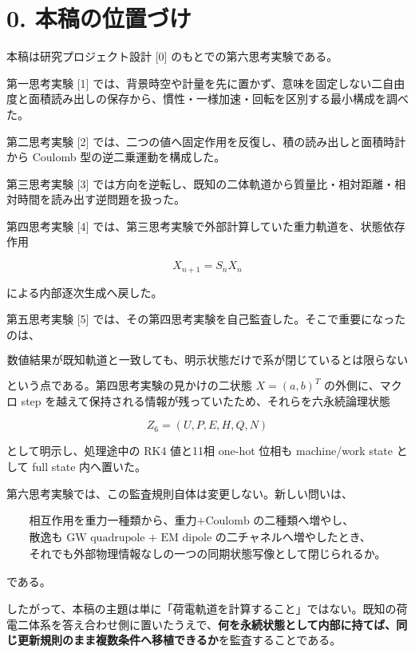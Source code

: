 \documentclass[
  a4paper,
]{ltjsarticle}
\begin{document}
\section{0.
本稿の位置づけ}\label{ux672cux7a3fux306eux4f4dux7f6eux3065ux3051}

本稿は研究プロジェクト設計 {[}0{]} のもとでの第六思考実験である。

第一思考実験 {[}1{]}
では、背景時空や計量を先に置かず、意味を固定しない二自由度と面積読み出しの保存から、慣性・一様加速・回転を区別する最小構成を調べた。

第二思考実験 {[}2{]}
では、二つの値へ固定作用を反復し、積の読み出しと面積時計から Coulomb
型の逆二乗運動を構成した。

第三思考実験 {[}3{]}
では方向を逆転し、既知の二体軌道から質量比・相対距離・相対時間を読み出す逆問題を扱った。

第四思考実験 {[}4{]}
では、第三思考実験で外部計算していた重力軌道を、状態依存作用

\[
X_{n+1}=S_nX_n
\]

による内部逐次生成へ戻した。

第五思考実験 {[}5{]}
では、その第四思考実験を自己監査した。そこで重要になったのは、

\[
\boxed{
\text{数値結果が既知軌道と一致しても、明示状態だけで系が閉じているとは限らない}
}
\]

という点である。第四思考実験の見かけの二状態 \(X=(a,b)^T\)
の外側に、マクロ step
を越えて保持される情報が残っていたため、それらを六永続論理状態

\[
Z_6=(U,P,E,H,Q,N)
\]

として明示し、処理途中の RK4 値と11相 one-hot 位相も machine/work state
として full state 内へ置いた。

第六思考実験では、この監査規則自体は変更しない。新しい問いは、

\[
\boxed{
\begin{array}{c}
\text{相互作用を重力一種類から、重力+Coulomb の二種類へ増やし、}\\
\text{散逸も GW quadrupole + EM dipole の二チャネルへ増やしたとき、}\\
\text{それでも外部物理情報なしの一つの同期状態写像として閉じられるか。}
\end{array}
}
\]

である。

したがって、本稿の主題は単に「荷電軌道を計算すること」ではない。既知の荷電二体系を答え合わせ側に置いたうえで、\textbf{何を永続状態として内部に持てば、同じ更新規則のまま複数条件へ移植できるか}を監査することである。
\end{document}
